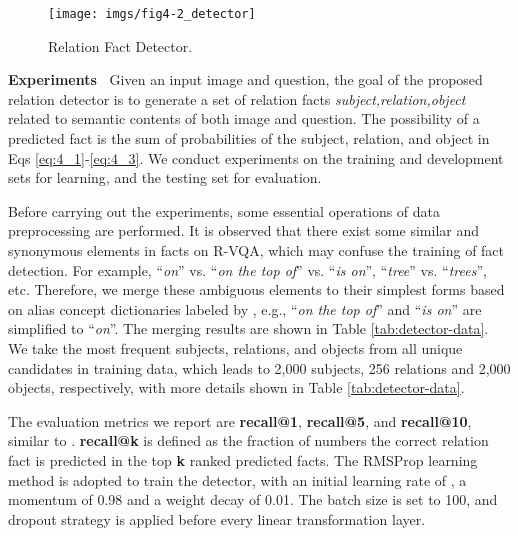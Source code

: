 \documentclass[sigconf]{acmart}
\begin{document}
\begin{figure}[t]
	\centering
	\texttt{[image: imgs/fig4-2\_detector]}
	\caption{Relation Fact Detector.}
	\label{detector}
\end{figure}




\textbf{Experiments~} Given an input image and question, the goal of the proposed relation detector is to generate a set of relation facts
\textit{subject,relation,object} related to semantic contents of both image and question. The possibility of a predicted fact is
the sum of probabilities of the subject, relation, and object in Eqs \ref{eq:4_1}-\ref{eq:4_3}.
We conduct experiments on the training and development sets for learning, and the testing set for evaluation. 

Before carrying out the experiments, some essential operations of data preprocessing are performed. It is observed that there exist some similar and synonymous elements in facts on R-VQA, which may confuse the training of fact detection. For example, ``\textit{on}'' vs. ``\textit{on the top of}'' vs. ``\textit{is on}'', ``\textit{tree}'' vs. ``\textit{trees}'', etc. Therefore, we merge these ambiguous elements to their simplest forms based on alias concept dictionaries labeled by \cite{krishna2017visual},  e.g., ``\textit{on the top of}'' and ``\textit{is on}'' are simplified to ``\textit{on}''. The merging results are shown in Table \ref{tab:detector-data}. We take the most frequent subjects, relations, and objects from all unique candidates in training data, which leads to 2,000 subjects, 256 relations and 2,000 objects, respectively, with more details shown in Table \ref{tab:detector-data}.

The evaluation metrics we report are \textbf{recall@1}, \textbf{recall@5}, and \textbf{recall@10}, similar to \cite{lu2016visual}. \textbf{recall@k} is defined as the fraction of numbers the correct relation fact is predicted in the top \textbf{k} ranked predicted facts. The RMSProp learning method is adopted to train the detector, with an initial learning rate of , a momentum of 0.98 and a weight decay of 0.01. The batch size is set to 100,
and dropout strategy is applied before every linear transformation layer. 
\end{document}

